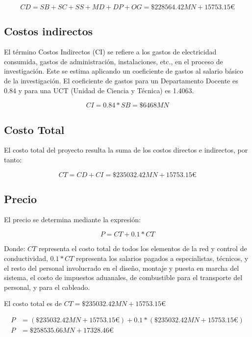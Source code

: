 \begin{equation}
    CD = SB + SC + SS + MD + DP + OG = \$228564.42 MN + 15753.15€
\end{equation}

\subsection{Costos indirectos}

El término Costos Indirectos (CI) se refiere a los gastos de electricidad consumida, gastos de administración, instalaciones, etc., en el proceso de investigación. Este se estima aplicando un coeficiente de gastos al salario básico de la investigación. El coeficiente de gastos para un Departamento Docente es 0.84 y para una UCT (Unidad de Ciencia y Técnica) es 1.4063.

\begin{equation}
    CI = 0.84 * SB = \$6468 MN
\end{equation}

\subsection{Costo Total}

El costo total del proyecto resulta la suma de los costos directos e indirectos, por tanto:

\begin{equation}
    CT = CD + CI = \$235032.42MN + 15753.15€
\end{equation}

\subsection{Precio}

El precio se determina mediante la expresión:

\begin{equation}
    P = CT + 0.1 * CT
\end{equation}

Donde: $CT$ representa el costo total de todos los elementos de la red y control de conductividad, $0.1*CT$ representa los salarios pagados a especialistas, técnicos, y el resto del personal involucrado en el diseño, montaje y puesta en marcha del sistema, el costo de impuestos aduanales, de combustible para el transporte del personal, y para el cableado.

El costo total es de $CT = \$235032.42MN + 15753.15€$

\begin{align*}
    P & = ( \$235032.42MN + 15753.15€) + 0.1*( \$235032.42MN + 15753.15€) \\
    P & = \$258535.66MN + 17328.46€
\end{align*}

